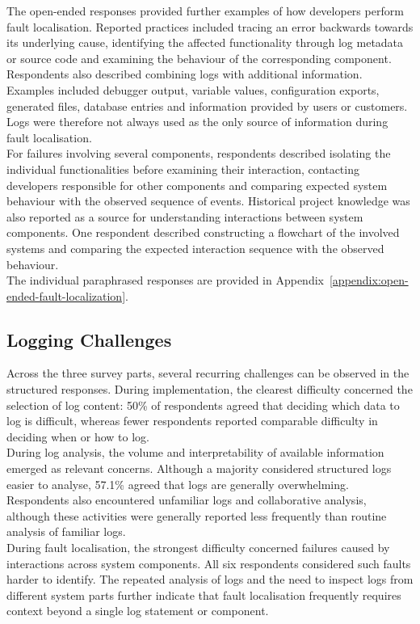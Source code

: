 The open-ended responses provided further examples of how developers perform fault
localisation. Reported practices included tracing an error backwards towards its
underlying cause, identifying the affected functionality through log metadata or
source code and examining the behaviour of the corresponding component.
\\
Respondents also described combining logs with additional information. Examples
included debugger output, variable values, configuration exports, generated files,
database entries and information provided by users or customers. Logs were therefore
not always used as the only source of information during fault localisation.
\\
For failures involving several components, respondents described isolating the
individual functionalities before examining their interaction, contacting developers
responsible for other components and comparing expected system behaviour with the
observed sequence of events. Historical project knowledge was also reported as a
source for understanding interactions between system components. One respondent
described constructing a flowchart of the involved systems and comparing the expected
interaction sequence with the observed behaviour.
\\
The individual paraphrased responses are provided in
Appendix~\ref{appendix:open-ended-fault-localization}.


\subsection{Logging Challenges}

Across the three survey parts, several recurring challenges can be observed in the
structured responses. During implementation, the clearest difficulty concerned the
selection of log content: 50\% of respondents agreed that deciding which data to log
is difficult, whereas fewer respondents reported comparable difficulty in deciding
when or how to log.
\\
During log analysis, the volume and interpretability of available information emerged
as relevant concerns. Although a majority considered structured logs easier to
analyse, 57.1\% agreed that logs are generally overwhelming. Respondents also
encountered unfamiliar logs and collaborative analysis, although these activities
were generally reported less frequently than routine analysis of familiar logs.
\\
During fault localisation, the strongest difficulty concerned failures caused by
interactions across system components. All six respondents considered such faults
harder to identify. The repeated analysis of logs and the need to inspect logs from
different system parts further indicate that fault localisation frequently requires
context beyond a single log statement or component.

